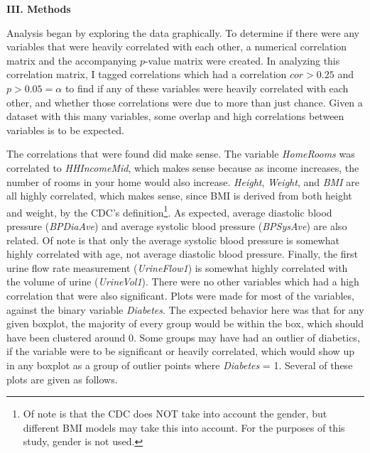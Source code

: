 \documentclass[letter,12pt]{article}
\begin{document}
	\begin{center}
		\textbf{III. Methods}
	\end{center}
	\justify
	Analysis began by exploring the data graphically. To determine if there were any variables that were heavily correlated with each other, a numerical correlation matrix and the accompanying $p$-value matrix were created. In analyzing this correlation matrix, I tagged correlations which had a correlation $cor > 0.25$ and $p > 0.05 = \alpha$ to find if any of these variables were heavily correlated with each other, and whether those correlations were due to more than just chance. Given a dataset with this many variables, some overlap and high correlations between variables is to be expected.\par
	The correlations that were found did make sense. The variable \textit{HomeRooms} was correlated to \textit{HHIncomeMid}, which makes sense because as income increases, the number of rooms in your home would also increase. \textit{Height}, \textit{Weight}, and \textit{BMI} are all highly correlated, which makes sense, since BMI is derived from both height and weight, by the CDC's definition\footnote{Of note is that the CDC does NOT take into account the gender, but different BMI models may take this into account. For the purposes of this study, gender is not used.}. As expected, average diastolic blood pressure (\textit{BPDiaAve}) and average systolic blood pressure (\textit{BPSysAve}) are also related. Of note is that only the average systolic blood pressure is somewhat highly correlated with age, not average diastolic blood pressure. Finally, the first urine flow rate measurement (\textit{UrineFlow1}) is somewhat highly correlated with the volume of urine (\textit{UrineVol1}). There were no other variables which had a high correlation that were also significant.
	Plots were made for most of the variables, against the binary variable \textit{Diabetes}. The expected behavior here was that for any given boxplot, the majority of every group would be within the box, which should have been clustered around 0. Some groups may have had an outlier of diabetics, if the variable were to be significant or heavily correlated, which would show up in any boxplot as a group of outlier points where \textit{Diabetes} = 1. Several of these plots are given as follows.
\end{document}
